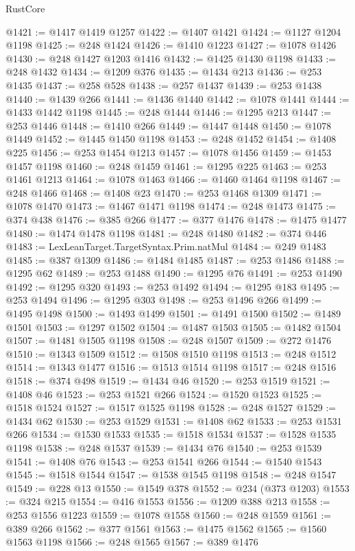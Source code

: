 \begin{lexlean}{RustCore}
\begin{coremodule}
@1421 := @1417 @1419 @1257
@1422 := @1407 @1421
@1424 := @1127 @1204 @1198
@1425 := @248 @1424
@1426 := @1410 @1223
@1427 := @1078 @1426
@1430 := @248 @1427 @1203 @1416
@1432 := @1425 @1430 @1198
@1433 := @248 @1432
@1434 := @1209 @376
@1435 := @1434 @213
@1436 := @253 @1435
@1437 := @258 @528
@1438 := @257 @1437
@1439 := @253 @1438
@1440 := @1439 @266
@1441 := @1436 @1440
@1442 := @1078 @1441
@1444 := @1433 @1442 @1198
@1445 := @248 @1444
@1446 := @1295 @213
@1447 := @253 @1446
@1448 := @1410 @266
@1449 := @1447 @1448
@1450 := @1078 @1449
@1452 := @1445 @1450 @1198
@1453 := @248 @1452
@1454 := @1408 @225
@1456 := @253 @1454 @1213
@1457 := @1078 @1456
@1459 := @1453 @1457 @1198
@1460 := @248 @1459
@1461 := @1295 @225
@1463 := @253 @1461 @1213
@1464 := @1078 @1463
@1466 := @1460 @1464 @1198
@1467 := @248 @1466
@1468 := @1408 @23
@1470 := @253 @1468 @1309
@1471 := @1078 @1470
@1473 := @1467 @1471 @1198
@1474 := @248 @1473
@1475 := @374 @438
@1476 := @385 @266
@1477 := @377 @1476
@1478 := @1475 @1477
@1480 := @1474 @1478 @1198
@1481 := @248 @1480
@1482 := @374 @446
@1483 := LexLeanTarget.TargetSyntax.Prim.natMul
@1484 := @249 @1483
@1485 := @387 @1309
@1486 := @1484 @1485
@1487 := @253 @1486
@1488 := @1295 @62
@1489 := @253 @1488
@1490 := @1295 @76
@1491 := @253 @1490
@1492 := @1295 @320
@1493 := @253 @1492
@1494 := @1295 @183
@1495 := @253 @1494
@1496 := @1295 @303
@1498 := @253 @1496 @266
@1499 := @1495 @1498
@1500 := @1493 @1499
@1501 := @1491 @1500
@1502 := @1489 @1501
@1503 := @1297 @1502
@1504 := @1487 @1503
@1505 := @1482 @1504
@1507 := @1481 @1505 @1198
@1508 := @248 @1507
@1509 := @272 @1476
@1510 := @1343 @1509
@1512 := @1508 @1510 @1198
@1513 := @248 @1512
@1514 := @1343 @1477
@1516 := @1513 @1514 @1198
@1517 := @248 @1516
@1518 := @374 @498
@1519 := @1434 @46
@1520 := @253 @1519
@1521 := @1408 @46
@1523 := @253 @1521 @266
@1524 := @1520 @1523
@1525 := @1518 @1524
@1527 := @1517 @1525 @1198
@1528 := @248 @1527
@1529 := @1434 @62
@1530 := @253 @1529
@1531 := @1408 @62
@1533 := @253 @1531 @266
@1534 := @1530 @1533
@1535 := @1518 @1534
@1537 := @1528 @1535 @1198
@1538 := @248 @1537
@1539 := @1434 @76
@1540 := @253 @1539
@1541 := @1408 @76
@1543 := @253 @1541 @266
@1544 := @1540 @1543
@1545 := @1518 @1544
@1547 := @1538 @1545 @1198
@1548 := @248 @1547
@1549 := @228 @13
@1550 := @1549 @378
@1552 := @234 (@373 @1203)
@1553 := @324 @215
@1554 := @416 @1553
@1556 := @1209 @388 @213
@1558 := @253 @1556 @1223
@1559 := @1078 @1558
@1560 := @248 @1559
@1561 := @389 @266
@1562 := @377 @1561
@1563 := @1475 @1562
@1565 := @1560 @1563 @1198
@1566 := @248 @1565
@1567 := @389 @1476

\end{coremodule}
\end{lexlean}
